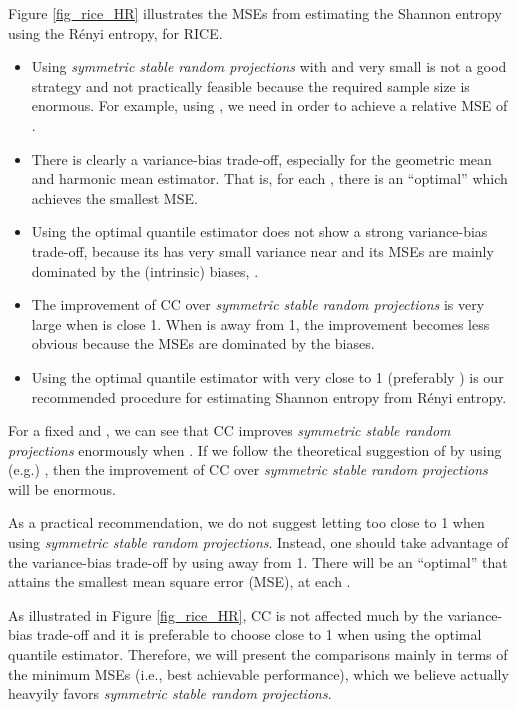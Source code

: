 \documentclass{sig-alternate}
\begin{document}
Figure \ref{fig_rice_HR} illustrates the MSEs from estimating the Shannon entropy using the R\'enyi entropy, for RICE.
\begin{itemize}
\item Using {\em symmetric stable random projections} with  and very small  is not a good strategy and not practically feasible because the required sample size is enormous. For example, using , we need  in order to achieve a relative MSE of . 
\item There is clearly a variance-bias trade-off, especially for the geometric mean and harmonic mean estimator.  That is, for each , there is an ``optimal''  which achieves the smallest MSE.
\item Using the optimal quantile estimator does not show a strong variance-bias trade-off, because its has very small variance near  and its MSEs are mainly dominated by the (intrinsic) biases, .
\item The improvement of CC over {\em symmetric stable random projections} is very large when  is close 1. When  is away from 1, the improvement becomes less obvious because the MSEs are dominated by the biases.
\item
Using the optimal quantile estimator with  very close to 1 (preferably  ) is our recommended procedure for estimating Shannon entropy from R\'enyi entropy.
\end{itemize}


For a fixed  and , we can see that CC improves {\em symmetric stable random projections} enormously when .  If we follow the theoretical suggestion of \cite{Article:Harvey_entropy_arXiv08,Proc:Harvey_FOCS08} by using (e.g.) , then the improvement of CC over {\em symmetric stable random projections} will be enormous.

As a practical recommendation, we do not suggest letting  too close to 1 when using {\em symmetric stable random projections}. Instead, one should take advantage of the variance-bias trade-off by using  away from 1. There will be an ``optimal''  that attains the smallest mean square error (MSE), at each . 


As illustrated in  Figure \ref{fig_rice_HR}, CC is not affected much by the variance-bias trade-off and it is preferable to choose   close to 1 when using the optimal quantile estimator. Therefore, we will present the comparisons mainly in terms of the minimum MSEs (i.e., best achievable performance), which we believe actually heavyily favors {\em symmetric stable random projections}.
\end{document}
